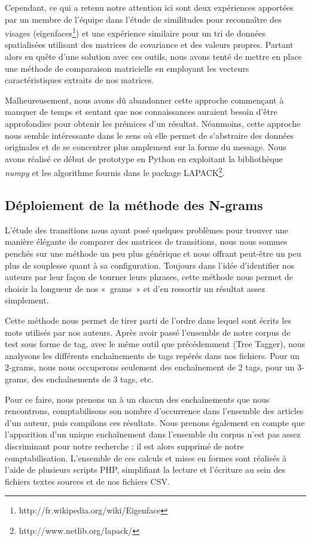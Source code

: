 \documentclass[a4paper,12pt]{report}
\begin{document}
Cependant, ce qui a retenu notre attention ici sont deux expériences apportées par un membre de l'équipe dans l'étude de similitudes pour reconnaître des visages (eigenfaces\footnote{http://fr.wikipedia.org/wiki/Eigenface}) et une expérience similaire pour un tri de données spatialisées utilisant des matrices de covariance et des valeurs propres. Partant alors en quête d'une solution avec ces outils, nous avons tenté de mettre en place une méthode de comparaison matricielle en employant les vecteurs caractéristiques extraits de nos matrices.

Malheureusement, nous avons dû abandonner cette approche commençant à manquer de temps et sentant que nos connaissances auraient besoin d'être approfondies pour obtenir les prémices d'un résultat. Néanmoins, cette approche nous semble intéressante dans le sens où elle permet de s'abstraire des données originales et de se concentrer plus amplement sur la forme du message. Nous avons réalisé ce début de prototype en Python en exploitant la bibliothèque \textit{numpy} et les algorithme fournis dans le package LAPACK\footnote{http://www.netlib.org/lapack/}.

\subsection{Déploiement de la méthode des N-grams}

L'étude des transitions nous ayant posé quelques problèmes pour trouver une manière élégante de comparer des matrices de transitions, nous nous sommes penchés sur une méthode un peu plus générique et nous offrant peut-être un peu plus de souplesse quant à sa configuration. Toujours dans l'idée d'identifier nos auteurs par leur façon de tourner leurs phrases, cette méthode nous permet de choisir la longueur de nos «~grams~» et d'en ressortir un résultat assez simplement.

Cette méthode nous permet de tirer parti de l'ordre dans lequel sont écrits les mots utilisés par nos auteurs. Après avoir passé l'ensemble de notre corpus de test sous forme de tag, avec le même outil que précédemment (Tree Tagger), nous analysons les différents enchaînements de tags repérés dans nos fichiers. Pour un 2-grams, nous nous occuperons seulement des enchaînement de 2 tags, pour un 3-grams, des enchaînements de 3 tags, etc.

Pour ce faire, nous prenons un à un chacun des enchaînements que nous rencontrons, comptabilisons son nombre d'occurrence dans l'ensemble des articles d'un auteur, puis compilons ces résultats. Nous prenons également en compte que l'apparition d'un unique enchaînement dans l'ensemble du corpus n'est pas assez discriminant pour notre recherche : il est alors supprimé de notre comptabilisation. L'ensemble de ces calculs et mises en formes sont réalisés à l'aide de plusieurs scripts PHP, simplifiant la lecture et l'écriture au sein des fichiers textes sources et de nos fichiers CSV.
\end{document}
